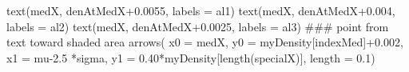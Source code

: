 \begin{Schunk}
\begin{Sinput}
 text(medX, denAtMedX+0.0055, labels = al1)
 text(medX, denAtMedX+0.004, labels = al2)
 text(medX, denAtMedX+0.0025, labels = al3)
 ### point from text toward shaded area
 arrows( x0 = medX, y0 = myDensity[indexMed]+0.002,
        x1 = mu-2.5 *sigma, y1 = 0.40*myDensity[length(specialX)], length = 0.1)
\end{Sinput}
\end{Schunk}
